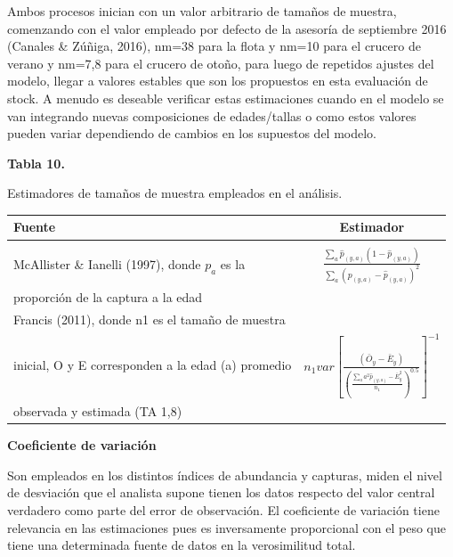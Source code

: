 \documentclass[
  spanish,
]{article}
\begin{document}
Ambos procesos inician con un valor arbitrario de tamaños de muestra,
comenzando con el valor empleado por defecto de la asesoría de
septiembre 2016 (Canales \& Zúñiga, 2016), nm=38 para la flota y nm=10
para el crucero de verano y nm=7,8 para el crucero de otoño, para luego
de repetidos ajustes del modelo, llegar a valores estables que son los
propuestos en esta evaluación de stock. A menudo es deseable verificar
estas estimaciones cuando en el modelo se van integrando nuevas
composiciones de edades/tallas o como estos valores pueden variar
dependiendo de cambios en los supuestos del modelo.

\small
\begin{center} 
\textbf{Tabla 10.}
\end{center}
\begin{center} 
\vspace{-0.2cm} Estimadores de tamaños de muestra empleados en el análisis.
\end{center}
\vspace{-0.2cm}

\begin{table}[h]
    \centering
    \resizebox{12cm}{!} {
    \begin{tabular}{|l|c|}
    \hline
    Fuente                                             &    Estimador \\ \hline 
                                                       & \\
    McAllister \& Ianelli (1997), donde $p_a$ es la     &   $\frac{\sum_a \hat{p}_{(y,a)} (1-\hat{p}_{(y,a)})}{\sum_a(p_{(y,a)}-\hat{p}_{(y,a)})^2 }$ \\ 
    proporción de la captura a la edad                 &                                                                                             \\ \hline
    Francis (2011), donde n1 es el tamaño de muestra   &    \\
    inicial, O y E corresponden a la edad (a) promedio & $n_1 var[\frac{(\bar{O}_y-\bar{E}_y )}{(\frac{\sum_a a^2 \hat{p}_{(y,a)}-\bar{E}_y^2}{n_1})^{0.5}}]^{-1}$ \\ 
    observada y estimada (TA 1,8)                      & \\ \hline
    \end{tabular}}
        \end{table}

\normalsize

\textbf{Coeficiente de variación}

Son empleados en los distintos índices de abundancia y capturas, miden
el nivel de desviación que el analista supone tienen los datos respecto
del valor central verdadero como parte del error de observación. El
coeficiente de variación tiene relevancia en las estimaciones pues es
inversamente proporcional con el peso que tiene una determinada fuente
de datos en la verosimilitud total.
\end{document}
